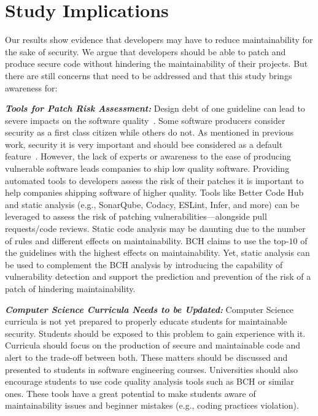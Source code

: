 \documentclass[smallextended]{svjour3}       %
\begin{document}
\section{Study Implications}\label{sec:implications}
%
Our results show evidence that developers may have to reduce maintainability for the 
sake of security. We argue that developers should be able to patch and produce 
secure code without hindering the maintainability of their projects. But there are 
still concerns that need to be addressed and that this study brings awareness for:
%

\textit{\textbf{Tools for Patch Risk Assessment:}}
	Design debt of one guideline can lead to severe impacts on the 
	software quality~\cite{10.1145/1985362.1985366}. Some software 
	producers consider security as a first class citizen while others 
	do not. As mentioned in previous work, security it is very important 
	and should bee considered as a default feature~\cite{10.1145/2489828.2489830,kurilova2014wyvern,mcgraw2004software}. 
	However, the lack of experts or awareness to the ease of producing 
	vulnerable software leads companies to ship low quality software. 
	Providing automated tools to developers assess the risk of their 
	patches it is important to help companies shipping software of higher quality. 
	Tools like Better Code Hub and static analysis (e.g., 
	SonarQube, Codacy, ESLint, Infer, and more) can be leveraged 
	to assess the risk of patching vulnerabilities---alongside pull
	requests/code reviews. Static code analysis may be daunting due 
	to the number of rules and different effects
	on maintainability. BCH claims to use the top-$10$ of the guidelines
	with the highest effects on maintainability. Yet, static analysis 
	can be used to complement the BCH analysis by introducing
	the capability of vulnerability detection and support the prediction 
	and prevention of the risk of a patch of hindering maintainability.
%

\textit{\textbf{Computer Science Curricula Needs to be Updated:}}
	Computer Science curricula is not yet prepared to properly educate 
	students for maintainable security. Students should be exposed to 
	this problem to gain experience with it. Curricula should focus on 
	the production of secure and maintainable code and alert to the 
	trade-off between both. These matters should be discussed and 
	presented to students in software engineering courses.
	Universities should also encourage students to use code quality 
	analysis tools such as BCH or similar ones. These tools have a 
	great potential to make students aware of maintainability issues 
	and beginner mistakes (e.g., coding practices violation).
%	
\end{document}
